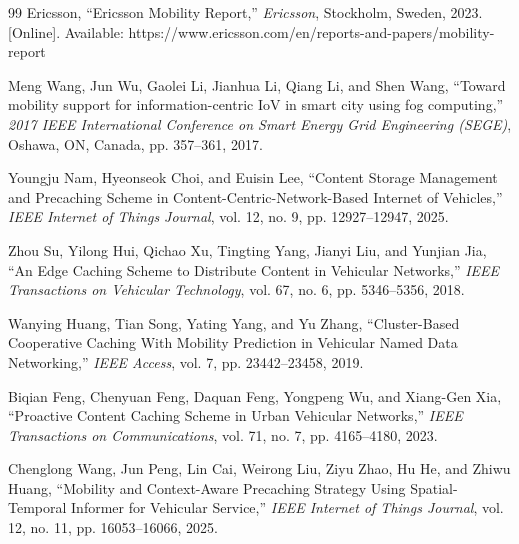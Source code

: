 \documentclass[journal]{IEEEtran}
\begin{document}


\begin{thebibliography}{99}
Ericsson, ``Ericsson Mobility Report,'' \emph{Ericsson}, Stockholm, Sweden, 2023. [Online]. Available: https://www.ericsson.com/en/reports-and-papers/mobility-report

Meng Wang, Jun Wu, Gaolei Li, Jianhua Li, Qiang Li, and Shen Wang, ``Toward mobility support for information-centric IoV in smart city using fog computing,'' \emph{2017 IEEE International Conference on Smart Energy Grid Engineering (SEGE)}, Oshawa, ON, Canada, pp. 357--361, 2017.%

Youngju Nam, Hyeonseok Choi, and Euisin Lee, ``Content Storage Management and Precaching Scheme in Content-Centric-Network-Based Internet of Vehicles,'' \emph{IEEE Internet of Things Journal}, vol. 12, no. 9, pp. 12927--12947, 2025.%

Zhou Su, Yilong Hui, Qichao Xu, Tingting Yang, Jianyi Liu, and Yunjian Jia, ``An Edge Caching Scheme to Distribute Content in Vehicular Networks,'' \emph{IEEE Transactions on Vehicular Technology}, vol. 67, no. 6, pp. 5346--5356, 2018.%

Wanying Huang, Tian Song, Yating Yang, and Yu Zhang, ``Cluster-Based Cooperative Caching With Mobility Prediction in Vehicular Named Data Networking,'' \emph{IEEE Access}, vol. 7, pp. 23442--23458, 2019.%

Biqian Feng, Chenyuan Feng, Daquan Feng, Yongpeng Wu, and Xiang-Gen Xia, ``Proactive Content Caching Scheme in Urban Vehicular Networks,'' \emph{IEEE Transactions on Communications}, vol. 71, no. 7, pp. 4165--4180, 2023.%

Chenglong Wang, Jun Peng, Lin Cai, Weirong Liu, Ziyu Zhao, Hu He, and Zhiwu Huang, ``Mobility and Context-Aware Precaching Strategy Using Spatial-Temporal Informer for Vehicular Service,'' \emph{IEEE Internet of Things Journal}, vol. 12, no. 11, pp. 16053--16066, 2025.%


\end{thebibliography}
\end{document}
